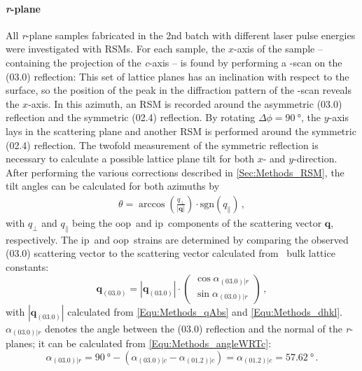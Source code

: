 \paragraph{\textit{r}-plane}
    All \textit{r}-plane samples fabricated in the 2nd batch with different laser pulse energies were investigated with \glspl{RSM}.
    For each sample, the $x$-axis of the sample -- containing the projection of the \textit{c}-axis -- is found by performing a \textphi-scan on the (03.0) reflection:
    This set of lattice planes has an inclination with respect to the surface, so the position of the peak in the diffraction pattern of the \textphi-scan reveals the $x$-axis.
    In this azimuth, an \gls{RSM} is recorded around the asymmetric (03.0) reflection and the symmetric (02.4) reflection.
    By rotating $\Delta\phi=\qty{90}{\degree}$, the $y$-axis lays in the scattering plane and another \gls{RSM} is performed around the symmetric (02.4) reflection.
    The twofold measurement of the symmetric reflection is necessary to calculate a possible lattice plane tilt for both $x$- and $y$-direction.
    After performing the various corrections described in \ref{Sec:Methods_RSM}, the tilt angles can be calculated for both azimuths by
    \begin{eqnarray}
        \theta = \arccos\left(
            \frac{q_\perp}{|\mathbf{q}|}
        \right) \cdot\mathrm{sgn}\left(q_\parallel\right)\,,
        \label{Equ:Results_3_tiltAngle}
    \end{eqnarray}
    with $q_\perp$ and $q_\parallel$ being the \gls{oop}\ and \gls{ip}\ components of the scattering vector $\mathbf{q}$, respectively.
    The \gls{ip}\ and \gls{oop}\ strains are determined by comparing the observed (03.0) scattering vector to the scattering vector calculated from \cro\ bulk lattice constants:
    \begin{equation}
        \mathbf{q}_\mathrm{(03.0)} = 
        \left|\mathbf{q}_\mathrm{(03.0)}\right|\cdot
        \begin{pmatrix}
            \cos\alpha_{(03.0)|r}\\
            \sin\alpha_{(03.0)|r}
        \end{pmatrix}\,,
    \end{equation}
    with $|\mathbf{q}_{(03.0)}|$ calculated from \eqref{Equ:Methods_qAbs} and \eqref{Equ:Methods_dhkl}.
    $\alpha_{(03.0)|r}$ denotes the angle between the (03.0) reflection and the normal of the \textit{r}-planes; it can be calculated from \eqref{Equ:Methods_angleWRTc}:
    \begin{equation}
        \alpha_{(03.0)|r}
        = \qty{90}{\degree}-\left(
            \alpha_{(03.0)|c}-\alpha_{(01.2)|c}
        \right)
        = \alpha_{(01.2)|c}
        = \qty{57.62}{\degree}\,.
    \end{equation}
